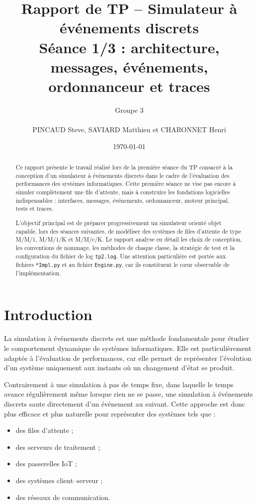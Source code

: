 \documentclass{article}
\title{
Rapport de TP -- Simulateur à événements discrets\\
\large Séance 1/3 : architecture, messages, événements, ordonnanceur et traces
}
\author{
Groupe 3 \\ \\
PINCAUD Steve, SAVIARD Matthieu et CHARONNET Henri
}
\date{\today}
\begin{document}
\maketitle

\begin{abstract}
Ce rapport présente le travail réalisé lors de la première séance du TP consacré à la conception d’un simulateur à événements discrets dans le cadre de l’évaluation des performances des systèmes informatiques. Cette première séance ne vise pas encore à simuler complètement une file d’attente, mais à construire les fondations logicielles indispensables : interfaces, messages, événements, ordonnanceur, moteur principal, tests et traces.

L’objectif principal est de préparer progressivement un simulateur orienté objet capable, lors des séances suivantes, de modéliser des systèmes de files d’attente de type M/M/1, M/M/1/K et M/M/c/K. Le rapport analyse en détail les choix de conception, les conventions de nommage, les méthodes de chaque classe, la stratégie de test et la configuration du fichier de log \texttt{tp2.log}. Une attention particulière est portée aux fichiers \texttt{*Impl.py} et au fichier \texttt{Engine.py}, car ils constituent le cœur observable de l’implémentation.
\end{abstract}

\tableofcontents
\newpage

\section{Introduction}
La simulation à événements discrets est une méthode fondamentale pour étudier le comportement dynamique de systèmes informatiques. Elle est particulièrement adaptée à l’évaluation de performances, car elle permet de représenter l’évolution d’un système uniquement aux instants où un changement d’état se produit.

Contrairement à une simulation à pas de temps fixe, dans laquelle le temps avance régulièrement même lorsque rien ne se passe, une simulation à événements discrets saute directement d’un événement au suivant. Cette approche est donc plus efficace et plus naturelle pour représenter des systèmes tels que :
\begin{itemize}[leftmargin=*]
    \item des files d’attente ;
    \item des serveurs de traitement ;
    \item des passerelles IoT ;
    \item des systèmes client--serveur ;
    \item des réseaux de communication.
\end{itemize}
\end{document}
